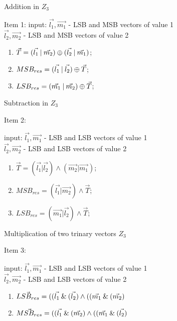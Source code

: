 \iffalse%
\begin{algorithm}
	\caption{Addition in $Z_3$}
		\label{alg:algpack1}  Item 1:
		input: $\vec{l_1}, \vec{m_1}$ - LSB and MSB vectors of value 1  \\
		  	  	$\vec{l_2}, \vec{m_2}$ - LSB and MSB vectors of value 2 \\
		
\begin{enumerate}

	\item $\vec{T} = (\vec{l_1} \mathbin{|} \vec{m_2}) \oplus (\vec{l_2} \mathbin{|} \vec{m_1})$;
	\item $MSB_{res} = ( \vec{l_1} \mathbin{|} \vec{l_2} ) \oplus  \vec{T} $;
	\item $LSB_{res} = (\vec{m_1} \mathbin{|} \vec{m_2} ) \oplus \vec{T} $;
	
	\end{enumerate}
	
\end{algorithm}

\begin{algorithm}
		\caption{Subtraction in $Z_3$}
		\label{alg:algpack2} Item 2:

	
		input: $\vec{l_1}, \vec{m_1}$ - LSB and LSB vectors of value 1  \\
                  $\vec{l_2}, \vec{m_2}$ - LSB and LSB vectors of value 2 \\
                  
\begin{enumerate}

	\item $\vec{T} = (\vec{l_1} | \vec{l_2}) \land (\vec{m_2} | \vec{m_1})$;
	\item $MSB_{res} = (\vec{l_1} | \vec{m_2} ) \land \vec{T}$;
    \item $LSB_{res} = (\vec{m_1} | \vec{l_2} ) \land \vec{T}$;
\end{enumerate}
	
	\end{algorithm}



\begin{algorithm}
			\caption{Multiplication of two trinary vectors $Z_3$}
		\label{alg:algpack3} Item 3:

		
				input: $\vec{l_1}, \vec{m_1}$ - LSB and LSB vectors of value 1  \\
		$\vec{l_2}, \vec{m_2}$ - LSB and LSB vectors of value 2 \\
		
			\begin{enumerate}
	\item  $\vec{LSB_{res}} = ((\vec{l_1} \mathbin{\&} (\vec{l_2}) \land     ((\vec{m_1} \mathbin{\&} (\vec{m_2})       $
	\item	$\vec{MSB_{res}}= ((\vec{l_1} \mathbin{\&} (\vec{m_2}) \land     ((\vec{m_1} \mathbin{\&} (\vec{l_2})       $

	\end{enumerate}
		
	\end{algorithm}

